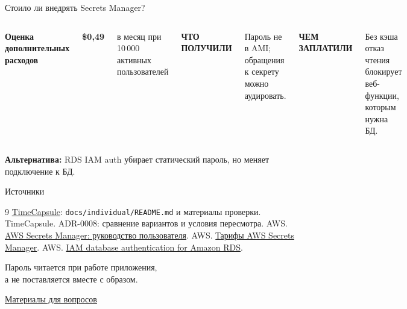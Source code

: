 \documentclass[aspectratio=169,10pt]{beamer}
\newcommand{\chip}[1]{\begingroup\setlength{\fboxsep}{4pt}\colorbox{sun}{\strut\textbf{#1}}\endgroup}
\newcommand{\tagline}[1]{{\small\bfseries\color{pine}#1}\par}
\newcommand{\slidelink}[2]{\hyperlink{#1}{\textcolor{pine}{\underline{#2}}}}
\begin{document}
\begin{frame}[label=decision]{Стоило ли внедрять Secrets Manager?}
  \begin{columns}[T,onlytextwidth]
    \chip{Оценка дополнительных расходов}
    \par\medskip
    {\fontsize{28}{30}\selectfont\bfseries\color{pine}\$0{,}49\par}
    \smallskip
    в месяц при 10\,000 активных пользователей
    \par{}
    \tagline{ЧТО ПОЛУЧИЛИ}
    Пароль не в AMI; обращения к секрету можно аудировать.
    \par\medskip
    \tagline{ЧЕМ ЗАПЛАТИЛИ}
    Без кэша отказ чтения блокирует веб-функции, которым нужна БД.
  \end{columns}
  \par\bigskip
  {\small\textbf{Альтернатива:} RDS IAM auth убирает статический пароль, но меняет подключение к БД.}
\end{frame}

\begin{frame}{Источники}
  \small
  \begin{thebibliography}{9}
     \href{https://github.com/LesikAWSLabsAAAAAA/timecapsule}{TimeCapsule}:
      \texttt{docs/individual/README.md} и материалы проверки.
     TimeCapsule. ADR-0008: сравнение вариантов и условия пересмотра.
     AWS. \href{https://docs.aws.amazon.com/secretsmanager/latest/userguide/intro.html}{AWS Secrets Manager: руководство пользователя}.
     AWS. \href{https://aws.amazon.com/secretsmanager/pricing/}{Тарифы AWS Secrets Manager}.
     AWS. \href{https://docs.aws.amazon.com/AmazonRDS/latest/UserGuide/UsingWithRDS.IAMDBAuth.html}{IAM database authentication for Amazon RDS}.
  \end{thebibliography}
\end{frame}

\begin{frame}[label=thanks]
  \bigskip
  {\large Пароль читается при работе приложения,\\
  а не поставляется вместе с образом.}
  \par\bigskip
  \slidelink{extras}{Материалы для вопросов}
\end{frame}
\end{document}
